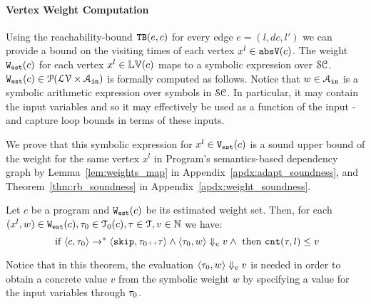 \paragraph{Vertex Weight Computation}
Using the reachability-bound ${\mathtt{TB}}(e, c)$ for every edge $e = (l, dc, l')$ we can provide a bound on the visiting times of each vertex $x^l \in \mathtt{abs}{\mathtt{V}}(c)$.
The weight $\mathtt{{W_{est}}}(c)$
for each vertex $x^l \in \mathbb{LV}(c)$ maps to a symbolic expression over $\mathcal{SC}$.
$\mathtt{{W_{est}}}(c) \in \mathcal{P}(\mathcal{LV} \times \mathcal{A}_{\mathtt{in}})$ is formally computed
as follows.
%
Notice that $w \in \mathcal{A}_{\mathtt{in}}$ is a symbolic arithmetic expression over symbols in $\mathcal{SC}$. In particular, it may contain the input variables and so it may effectively be used as a function of the input - and capture loop bounds in terms of these inputs.
 
We prove that this 
symbolic expression for $x^l \in \mathtt{{V_{est}}}(c)$ is a sound upper bound of 
the weight for the same vertex $x^l$ in Program's semantics-based dependency graph by Lemma~\ref{lem:weights_map}
in Appendix~\ref{apdx:adapt_soundness}, and Theorem~\ref{thm:rb_soundness} in Appendix~\ref{apdx:weight_soundness}.

\begin{thm}
  \label{thm:addweight_soundness}
Let  ${c}$ be a program and $\mathtt{{W_{est}}}(c)$ be its estimated weight set.
Then, for each $(x^l, w) \in \mathtt{{W_{est}}}(c),\mathtt{\tau}_0 \in \mathcal{T}_0(c), \mathtt{\tau} \in \mathcal{T},
v \in \mathbb{N}$ we have:
\[
 \text{ if }
\langle {c}, \mathtt{\tau}_0 \rangle \to^{*} \langle \mathtt{skip}, \mathtt{\tau}_0 {\scriptscriptstyle ++}\mathtt{\tau} \rangle 
\land 
\langle \mathtt{\tau}_0, w \rangle \Downarrow_e v
\land
\text{ then }
\mathtt{cnt}(\mathtt{\tau}, l) \leq v
\]
\end{thm}
Notice that in this theorem, the evaluation $\langle \mathtt{\tau}_0, w \rangle \Downarrow_e v$ is needed in order to obtain a concrete value $v$ from the symbolic weight $w$ by specifying a value for the input variables through $\mathtt{\tau}_0$.



